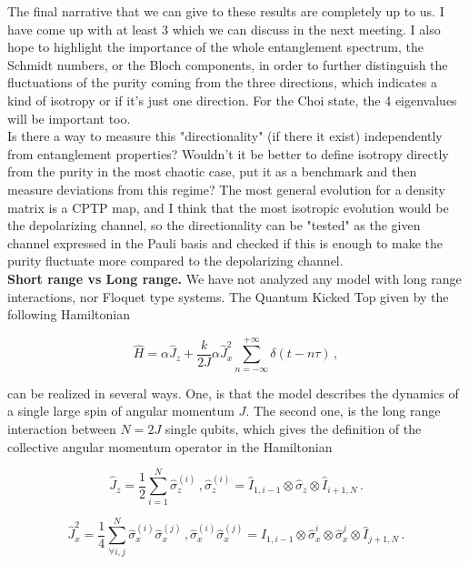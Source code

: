 The final narrative that we can give to these results are completely up to us. I have come up with at least 3 which we can discuss in the next meeting. I also hope to highlight the importance of the whole entanglement spectrum, the Schmidt numbers, or the Bloch components, in order to further distinguish the fluctuations of the purity coming from the three directions, which indicates a kind of isotropy or if it's just one direction. For the Choi state, the 4 eigenvalues will be important too.\\

Is there a way to measure this "directionality" (if there it exist) independently from entanglement properties? Wouldn't it be better to define isotropy directly from the purity in the most chaotic case, put it as a benchmark and then measure deviations from this regime? The most general evolution for a density matrix is a CPTP map, and I think that the most isotropic evolution would be the depolarizing channel, so the directionality can be "tested" as the given channel expressed in the Pauli basis and checked if this is enough to make the purity fluctuate more compared to the depolarizing channel.\\


\textbf{Short range vs Long range.} We have not analyzed any model with long range interactions, nor Floquet type systems. The Quantum Kicked Top given by the following Hamiltonian

\begin{equation}
    \hat{H} = \alpha\hat{J}_{z} + \dfrac{k}{2J}\alpha\hat{J}_{x}^2\sum_{n = -\infty}^{+\infty}\delta(t-n\tau) \, ,
    \label{eq:qkt}
\end{equation}

can be realized in several ways. One, is that the model describes the dynamics of a single large spin of angular momentum $J$. The second one, is the long range interaction between $N = 2J$ single qubits, which gives the definition of the collective angular momentum operator in the Hamiltonian

\begin{equation}
   \hat{J}_{z} = \dfrac{1}{2}\sum_{i=1}^{N}\hat{\sigma}_{z}^{(i)} \, , \hat{\sigma}_{z}^{(i)} = \hat{I}_{1,i-1}\otimes\hat{\sigma}_{z}\otimes\hat{I}_{i+1,N} \, .
\end{equation}

\begin{equation}
   \hat{J}_{x}^2 = \dfrac{1}{4}\sum_{\forall i,j}^{N}\hat{\sigma}_{x}^{(i)}\hat{\sigma}_{x}^{(j)} \, , \hat{\sigma}_{x}^{(i)}\hat{\sigma}_{x}^{(j)} = \hat{I}_{1,i-1}\otimes\hat{\sigma}_{x}^{i}\otimes\hat{\sigma}_{x}^{j}\otimes\hat{I}_{j+1,N} \, .
\end{equation}

